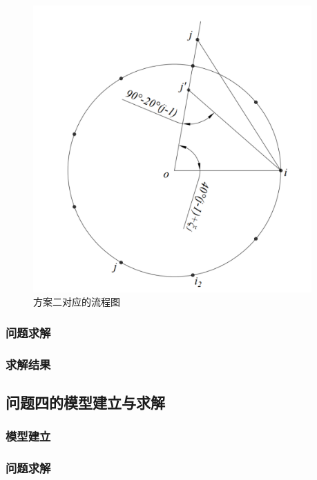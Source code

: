 \documentclass[withoutpreface,bwprint]{cumcmthesis} %
\begin{document}
\begin{enumerate}
\begin{figure}[H]
    \centering
    \includegraphics[width=0.95\textwidth]{../../figure/q3_1.png} 
    \caption{方案二对应的流程图}
    \label{q3_1}    
\end{figure}




\end{enumerate}







\subsubsection{问题求解}
\subsubsection{求解结果}


\subsection{问题四的模型建立与求解}
\subsubsection{模型建立}
\subsubsection{问题求解}
\end{document}
